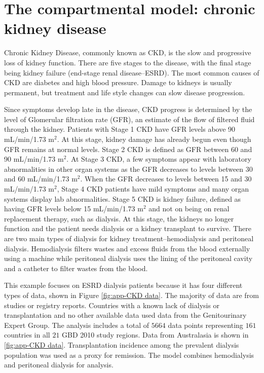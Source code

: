 \chapter{The compartmental model: chronic kidney disease}
\label{applications-fits_incon_v_con}

Chronic Kidney Disease, commonly known as CKD, is the slow and
progressive loss of kidney function. There are five stages to the
disease, with the final stage being kidney failure (end-stage renal
disease--ESRD). The most common causes of CKD are diabetes and high
blood pressure.  Damage to kidneys is usually permanent, but treatment
and life style changes can slow disease
progression. \cite{_k/doqi_2002}

Since symptoms develop late in the disease, CKD progress is determined
by the level of Glomerular filtration rate (GFR), an estimate of the
flow of filtered fluid through the kidney. Patients with Stage 1 CKD
have GFR levels above 90 mL/min/1.73 m$^2$.  At this stage, kidney
damage has already begun even though GFR remains at normal levels.
Stage 2 CKD is defined as GFR between 60 and 90 mL/min/1.73 m$^2$.  At
Stage 3 CKD, a few symptoms appear with laboratory abnormalities in
other organ systems as the GFR decreases to levels between 30 and 60
mL/min/1.73 m$^2$.  When the GFR decreases to levels between 15 and 30
mL/min/1.73 m$^2$, Stage 4 CKD patients have mild symptoms and many
organ systems display lab abnormalities.  Stage 5 CKD is kidney
failure, defined as having GFR levels below 15 mL/min/1.73 m$^2$ and
not on being on renal replacement therapy, such as dialysis.  At this
stage, the kidneys no longer function and the patient needs dialysis
or a kidney transplant to survive.  There are two main types of
dialysis for kidney treatment--hemodialysis and peritoneal dialysis.
Hemodialysis filters wastes and excess fluids from the blood
externally using a machine while peritoneal dialysis uses the lining
of the peritoneal cavity and a catheter to filter wastes from the
blood. \cite{_k/doqi_2002, dipiro_pharmacotherapy:_2008}

This example focuses on ESRD dialysis patients because it has four
different types of data, shown in Figure \ref{fig:app-CKD data}.  The
majority of data are from studies or registry reports.  Countries with
a known lack of dialysis or transplantation and no other available data
used data from the Genitourinary Expert Group.  The analysis
includes a total of $5664$ data points representing $161$ countries in
all $21$ GBD 2010 study regions.  Data from Australasia is shown in 
\ref{fig:app-CKD data}.  Transplantation incidence among the prevalent
dialysis population was used as a proxy for remission.  The model
combines hemodialysis and peritoneal dialysis for analysis.

